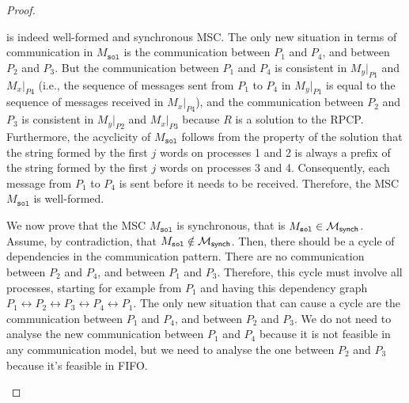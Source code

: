 \begin{proof}
\begin{itemize}
		      is indeed well-formed and synchronous MSC.
		      The only new situation in terms of communication in $M_{\texttt{sol}}$ is the
		      communication between $P_1$ and $P_4$, and between $P_2$ and $P_3$.
		      But the communication between $P_1$ and $P_4$ is consistent in
		      $M_y|_{P1}$ and $M_x|_{P4}$ (i.e., the sequence of messages sent from $P_1$ to
		      $P_4$ in $M_y|_{P1}$ is equal to the sequence of messages received in $M_x|_{P4}$),
		      and the communication between $P_2$ and $P_3$ is consistent in
		      $M_y|_{P2}$ and $M_x|_{P3}$ because $R$ is a solution to the RPCP.
		      Furthermore, the acyclicity of $M_{\texttt{sol}}$ follows from the property of the
		      solution that the string formed by the first $j$ words on processes 1
		      and 2 is always a prefix of the string formed by the first $j$ words
		      on processes 3 and 4. Consequently, each message from $P_1$ to $P_4$
		      is sent before it needs to be received. 
			  Therefore, the MSC $M_{\texttt{sol}}$ is well-formed.

		      We now prove that the MSC $M_{\texttt{sol}}$ is synchronous, that is
			  $M_{\texttt{sol}} \in \mathcal{M}_{\mathsf{synch}}$.
		      Assume, by contradiction, that 
			  $M_{\texttt{sol}} \notin \mathcal{M}_{\mathsf{synch}}$.
		      Then, there should be a cycle of dependencies in the communication pattern.
		      There are no communication between $P_2$ and $P_4$, and between $P_1$
		      and $P_3$. Therefore, this cycle must involve all processes, starting
		      for example from $P_1$ and having this dependency graph
		      $P_1\leftrightarrow P_2\leftrightarrow P_3\leftrightarrow P_4\leftrightarrow P_1$.
		      The only new situation that can cause a cycle are the communication
		      between $P_1$ and $P_4$, and between $P_2$ and $P_3$.
		      We do not need to analyse the new communication between $P_1$ and $P_4$ because
		      it is not feasible in any communication model, but we need to analyse the one
		      between $P_2$ and $P_3$ because it's feasible in FIFO.




\end{itemize}
\end{proof}
